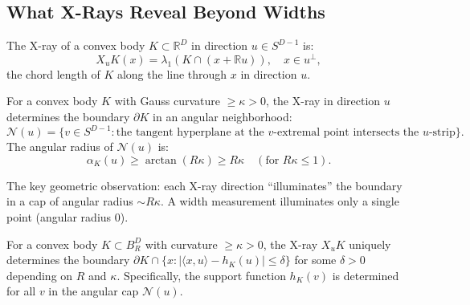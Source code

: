 % 
%
%
%
%


\subsection{What X-Rays Reveal Beyond Widths}

\begin{definition}[X-ray]
The X-ray of a convex body $K \subset \mathbb{R}^D$ in direction $u \in S^{D-1}$ is:
\[
  X_u K(x) = \lambda_1(K \cap (x + \mathbb{R}u)), \quad x \in u^\perp,
\]
the chord length of $K$ along the line through $x$ in direction $u$.
\end{definition}

\begin{definition}
For a convex body $K$ with Gauss curvature $\geq \kappa > 0$, the X-ray in direction $u$ determines the boundary $\partial K$ in an angular neighborhood:
\[
  \mathcal{N}(u) = \{v \in S^{D-1} : \text{the tangent hyperplane at the } v\text{-extremal point intersects the } u\text{-strip}\}.
\]
The angular radius of $\mathcal{N}(u)$ is:
\[
  \alpha_K(u) \geq \arctan(R\kappa) \geq R\kappa \quad (\text{for } R\kappa \leq 1).
\]
\end{definition}

The key geometric observation: each X-ray direction ``illuminates'' the boundary in a cap of angular radius $\sim R\kappa$. A width measurement illuminates only a single point (angular radius $0$).

\begin{lemma}
\label{lem:boundary}
For a convex body $K \subset B_R^D$ with curvature $\geq \kappa > 0$, the X-ray $X_u K$ uniquely determines the boundary $\partial K \cap \{x : |\langle x, u \rangle - h_K(u)| \leq \delta\}$ for some $\delta > 0$ depending on $R$ and $\kappa$. Specifically, the support function $h_K(v)$ is determined for all $v$ in the angular cap $\mathcal{N}(u)$.
\end{lemma}

